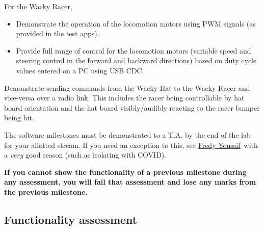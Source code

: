 \documentclass[11pt, a4paper]{article}
\makeatletter
\newcommand{\fredy}{\href{mailto:fredy.youssif@pg.canterbury.ac.nz}{Fredy Youssif}}
\makeatother
\begin{document}
\begin{description}
  For the Wacky Racer,
  \begin{itemize}
    \item Demonstrate the operation of the locomotion motors using PWM signals (as provided in the test apps).
    \item Provide full range of control for the locomotion motors (variable speed and steering control in the forward and backward directions) based on duty cycle values entered on a PC using USB CDC.
    \end{itemize}

\item[Radio control]

  Demonstrate sending commands from the Wacky Hat to the Wacky Racer
  and vice-versa over a radio link. This includes the racer being controllable
  by hat board orientation and the hat board visibly/audibly reacting to the
  racer bumper being hit.

\end{description}


The software milestones must be demonstrated to a T.A. by the end of
the lab for your allotted stream.  If you need an exception to this,
see \fredy\ with a \emph{very} good reason (such as isolating with
COVID).

\textbf{If you cannot show the functionality of a previous milestone
  during any assessment, you will fail that assessment and lose any
  marks from the previous milestone.}

\vfill\pagebreak

\subsection{Functionality assessment}
\label{sec:functionality}
\end{document}
